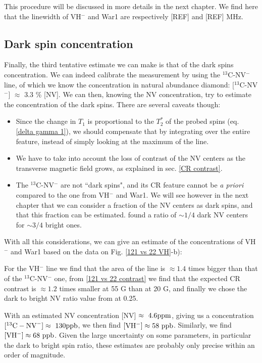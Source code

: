 \documentclass[a4paper,11pt]{report}
\begin{document}
This procedure will be discussed in more details in the next chapter. We find here that the linewidth of VH$^-$ and War1 are respectively [REF] and [REF] MHz.

\subsection{Dark spin concentration}

Finally, the third tentative estimate we can make is that of the dark spins concentration. We can indeed calibrate the measurement by using the $^{13}$C-NV$^-$ line, of which we know the concentration in natural abundance diamond: [$^{13}$C-NV$^-$] $\approx$ 3.3 \% [NV]. We can then, knowing the NV concentration, try to estimate the concentration of the dark spins. There are several caveats though:

\begin{itemize}
\item Since the change in $T_1$ is proportional to the $T_2^*$ of the probed spins (eq. \ref{delta gamma 1}), we should compensate that by integrating over the entire feature, instead of simply looking at the maximum of the line.
\item We have to take into account the loss of contrast of the NV centers as the transverse magnetic field grows, as explained in sec. \ref{CR contrast}.
\item The $^{13}$C-NV$^-$ are not ``dark spins", and its CR feature cannot be \textit{a priori} compared to the one from VH$^-$ and War1. We will see however in the next chapter that we can consider a fraction of the NV centers as dark spins, and that this fraction can be estimated. \citep{choi2017depolarization} found a ratio of $\sim 1/4$ dark NV centers for $\sim 3/4$ bright ones.
\end{itemize}

With all this considerations, we can give an estimate of the concentrations of VH$^-$ and War1 based on the data on Fig. \ref{121 vs 22 VH}-b): 

For the VH$^-$ line we find that the area of the line is $\approx 1.4$ times bigger than that of the $^{13}$C-NV$^-$ one, from \ref{121 vs 22 contrast} we find that the expected CR contrast is $\approx 1.2$ times smaller at 55 G than at 20 G, and finally we chose the dark to bright NV ratio value from \citep{choi2017depolarization} at 0.25.

With an estimated NV concentration [NV] $\approx\ \rm 4.6 ppm$, giving us a concentration $[^{13}\rm{C-NV}^-]\approx \ \rm 130 ppb$, we then find $[\rm VH^-] \approx 58\ \rm ppb$. Similarly, we find $[\rm VH^-] \approx 68\ \rm ppb$. Given the large uncertainty on some parameters, in particular the dark to bright spin ratio, these estimates are probably only precise within an order of magnitude.
\end{document}
